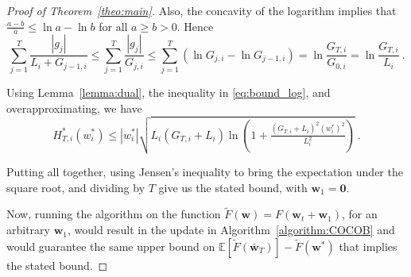 \documentclass{article}
\newcommand{\bw}{\boldsymbol{w}}
\newcommand{\field}[1]{\mathbb{#1}}
\newcommand{\E}{\field{E}}
\begin{document}
\begin{proof}[Proof of Theorem~\ref{theo:main}]
Also, the concavity of the logarithm implies that $\frac{a-b}{a}\leq \ln a - \ln b$ for all $a \geq b >0$. Hence
\begin{equation}
\label{eq:bound_log}
\sum_{j=1}^T \frac{|g_j|}{L_i+G_{j-1,i}} 
\leq \sum_{j=1}^T \frac{|g_j|}{G_{j,i}} 
\leq \sum_{j=1}^T (\ln G_{j,i} - \ln G_{j-1,i}) 
= \ln \frac{G_{T,i}}{G_{0,i}}
= \ln \frac{G_{T,i}}{L_i}~.
\end{equation}

Using Lemma~\ref{lemma:dual}, the inequality in \eqref{eq:bound_log}, and overapproximating, we have
\[
H^*_{T,i}(w^*_i) \leq |w^*_i| \sqrt{ L_i (G_{T,i} +L_i)\ln\left(1+ \tfrac{(G_{T,i}+L_i)^2 (w_i^*)^2}{L_i^2}\right)}~.
\]

Putting all together, using Jensen's inequality to bring the expectation under the square root, and dividing by $T$ give us the stated bound, with $\bw_1=\boldsymbol{0}$.

Now, running the algorithm on the function $\tilde{F}(\bw)=F(\bw_t+\bw_1)$, for an arbitrary $\bw_1$, would result in the update in Algorithm~\ref{algorithm:COCOB} and would guarantee the same upper bound on $\E[\tilde{F}\left(\bar{\bw}_T\right)] - \tilde{F}(\bw^*) $ that implies the stated bound.
\end{proof}

 
\end{document}
